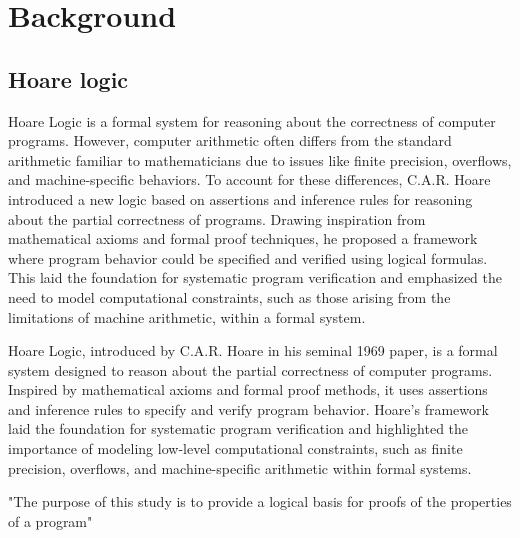 
%


\chapter{Background}
\label{cha:Background}


\section{Hoare logic}
\label{sec:Hoare_logic}

Hoare Logic is a formal system for reasoning about the correctness of computer programs. However, 
computer arithmetic often differs from the standard arithmetic familiar to mathematicians due to issues like finite 
precision, overflows, and machine-specific behaviors. To account for these differences, C.A.R. Hoare introduced a new logic
based on assertions and inference rules for reasoning about the partial correctness of programs. Drawing inspiration 
from mathematical axioms and formal proof techniques, he proposed a framework where program behavior could be specified 
and verified using logical formulas. This laid the foundation for systematic program verification and emphasized the need 
to model computational constraints, such as those arising from the limitations of machine arithmetic, within a formal system.

Hoare Logic, introduced by C.A.R. Hoare in his seminal 1969 paper, is a formal system designed to reason about the partial 
correctness of computer programs. Inspired by mathematical axioms and formal proof methods, it uses assertions and inference 
rules to specify and verify program behavior. Hoare's framework laid the foundation for systematic program verification and 
highlighted the importance of modeling low-level computational constraints, such as finite precision, overflows, and 
machine-specific arithmetic within formal systems.

"The purpose of this study is to provide a logical basis for proofs of the properties of a program"


